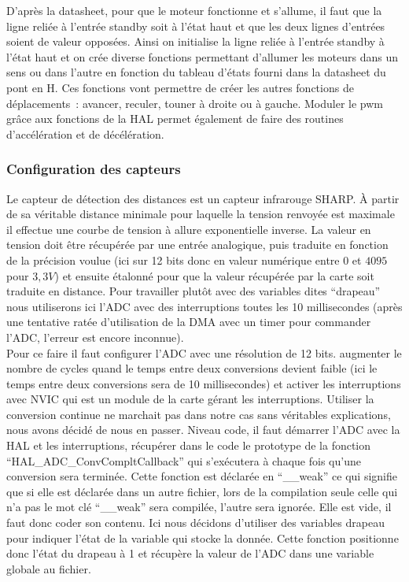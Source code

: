 \documentclass{article}
\begin{document}
D'après la datasheet, pour que le moteur fonctionne et s'allume, il faut que la ligne reliée à l'entrée standby soit à l'état haut et que les deux lignes d'entrées soient de valeur opposées. Ainsi on initialise la ligne reliée à l'entrée standby à l'état haut et on crée diverse fonctions permettant d'allumer les moteurs dans un sens ou dans l'autre en fonction du tableau d'états fourni dans la datasheet du pont en H. Ces fonctions vont permettre de créer les autres fonctions de déplacements~: avancer, reculer, touner à droite ou à gauche. Moduler le pwm grâce aux fonctions de la HAL permet également de faire des routines d'accélération et de décélération.

\subsubsection{Configuration des capteurs}

Le capteur de détection des distances est un capteur infrarouge SHARP. À partir de sa véritable distance minimale pour laquelle la tension renvoyée est maximale il effectue une courbe de tension à allure exponentielle inverse. La valeur en tension doit être récupérée par une entrée analogique, puis traduite en fonction de la précision voulue (ici sur 12 bits donc en valeur numérique entre $0$ et $4095$ pour $3,3V$) et ensuite étalonné pour que la valeur récupérée par la carte soit traduite en distance. Pour travailler plutôt avec des variables dites ``drapeau'' nous utiliserons ici l'ADC avec des interruptions toutes les 10 millisecondes (après une tentative ratée d'utilisation de la DMA avec un timer pour commander l'ADC, l'erreur est encore inconnue).\\

Pour ce faire il faut configurer l'ADC avec une résolution de 12 bits. augmenter le nombre de cycles quand le temps entre deux conversions devient faible (ici le temps entre deux conversions sera de 10 millisecondes) et activer les interruptions avec NVIC qui est un module de la carte gérant les interruptions. Utiliser la conversion continue ne marchait pas dans notre cas sans véritables explications, nous avons décidé de nous en passer. Niveau code, il faut démarrer l'ADC avec la HAL et les interruptions, récupérer dans le code le prototype de la fonction ``HAL\_ADC\_ConvCompltCallback'' qui s’exécutera à chaque fois qu'une conversion sera terminée. Cette fonction est déclarée en ``\_\_weak'' ce qui signifie que si elle est déclarée dans un autre fichier, lors de la compilation seule celle qui n'a pas le mot clé ``\_\_weak'' sera compilée, l'autre sera ignorée. Elle est vide, il faut donc coder son contenu. Ici nous décidons d'utiliser des variables drapeau pour indiquer l'état de la variable qui stocke la donnée. Cette fonction positionne donc l'état du drapeau à 1 et récupère la valeur de l'ADC dans une variable globale au fichier. \\
\end{document}
